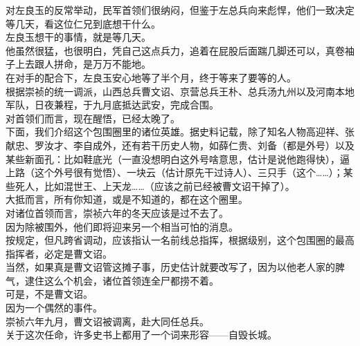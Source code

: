 \begin{multicols}{\theparacolNo}
对左良玉的反常举动，民军首领们很纳闷，但鉴于左总兵向来彪悍，他们一致决定等几天，看这位仁兄到底想干什么。\\

左良玉想干的事情，就是等几天。\\

他虽然很猛，也很明白，凭自己这点兵力，追着在屁股后面踹几脚还可以，真卷袖子上去跟人拼命，是万万不能地。\\

在对手的配合下，左良玉安心地等了半个月，终于等来了要等的人。\\

根据崇祯的统一调派，山西总兵曹文诏、京营总兵王朴、总兵汤九州以及河南本地军队，日夜兼程，于九月底抵达武安，完成合围。\\

对首领们而言，现在醒悟，已经太晚了。\\

下面，我们介绍这个包围圈里的诸位英雄。据史料记载，除了知名人物高迎祥、张献忠、罗汝才、李自成外，还有若干历史人物，如薛仁贵、刘备（都是外号）以及某些新面孔：比如鞋底光（一直没想明白这外号啥意思，估计是说他跑得快），逼上路（这个外号很有觉悟）、一块云（估计原先干过诗人）、三只手（这个……）；某些死人，比如混世王、上天龙……（应该之前已经被曹文诏干掉了）。\\

大抵而言，所有你知道，或是不知道的，都在这个圈里。\\

对诸位首领而言，崇祯六年的冬天应该是过不去了。\\

因为除被围外，他们即将迎来另一个相当可怕的消息。\\

按规定，但凡跨省调动，应该指认一名前线总指挥，根据级别，这个包围圈的最高指挥者，必定是曹文诏。\\

当然，如果真是曹文诏管这摊子事，历史估计就要改写了，因为以他老人家的脾气，逮住这么个机会，诸位首领连全尸都捞不着。\\

可是，不是曹文诏。\\

因为一个偶然的事件。\\

崇祯六年九月，曹文诏被调离，赴大同任总兵。\\

关于这次任命，许多史书上都用了一个词来形容——自毁长城。\\


\end{multicols}
